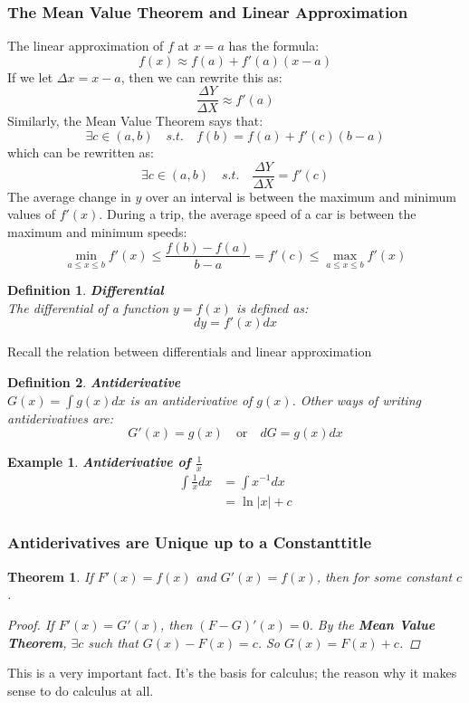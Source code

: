 \documentclass[10pt, a4paper]{article}
\newtheorem{theorem}{Theorem}
\newtheorem{definition}{Definition}
\newtheorem{example}{Example}
\begin{document}
\subsubsection*{The Mean Value Theorem and Linear Approximation}
The linear approximation of $f$ at $x = a$ has the formula:
\[f(x)\approx f(a)+f'(a)(x-a)\]
If we let $\Delta x = x - a$, then we can rewrite this as:
\[\frac{\Delta Y}{\Delta X} \approx f'(a)\]
Similarly, the Mean Value Theorem says that:
\[\exists c \in (a, b) \quad s.t. \quad f(b) = f(a) + f'(c)(b - a)\]
which can be rewritten as:
\[\exists c \in (a, b) \quad s.t. \quad \frac{\Delta Y}{\Delta X} = f'(c)\]
The average change in $y$ over an interval is between the maximum and minimum values of $f'(x)$. 
During a trip, the average speed of a car is between the maximum and minimum speeds:
\[\min_{a\leq x\leq b}f'(x)\leq\frac{f(b)-f(a)}{b-a}=f'(c)\leq\max_{a\leq x\leq b}f'(x)\]

\begin{definition}
    \textbf{Differential} \\
    The differential of a function $y = f(x)$ is defined as:
    \[dy = f'(x)dx\]
\end{definition}
\ast  Recall the relation between differentials and linear approximation

\begin{definition}
    \textbf{Antiderivative} \\
    $G(x) = \int g(x)dx$ is an antiderivative of $g(x)$. Other ways of writing antiderivatives are:
    \[G'(x) = g(x)\quad\text{or}\quad dG = g(x)dx\]
\end{definition}

\begin{example}
    \textbf{Antiderivative of $\frac{1}{x}$}
    \begin{align*}
        \int\frac{1}{x}dx &= \int x^{-1}dx \\
        &= \ln|x| + c
    \end{align*}
\end{example}

\subsubsection*{Antiderivatives are Unique up to a Constanttitle}
\begin{theorem}
    If $F'(x) = f(x)$ and $G'(x) = f(x)$, then  for some constant $c$.
    \begin{proof}
        If $F'(x) = G'(x)$, then $(F - G)'(x) = 0$. By the \textbf{Mean Value Theorem}, $\exists c$ such that
        $G(x) - F(x) = c$. So $G(x) = F(x) + c$.
    \end{proof}  
\end{theorem}

This is a very important fact. It's the basis for calculus; the reason why it makes sense to do calculus at all.
\end{document}
